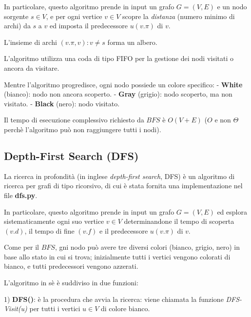 \documentclass[a4paper,12pt]{article}
\begin{document}
In particolare, questo algoritmo prende in input un grafo $G = (V, E)$ e un nodo sorgente $s \in V$, e per ogni vertice $v \in V$ scopre la \textit{distanza} (numero minimo di archi) da $s$ a $v$ ed imposta il predecessore $u (v.\pi)$ di $v$.

L’insieme di archi ${(v.\pi, v) : v\neq s}$ forma un albero.

L'algoritmo utilizza una coda di tipo FIFO per la gestione dei nodi visitati o ancora da visitare.
\newline

Mentre l'algoritmo progredisce, ogni nodo possiede un colore specifico:\newline
- \textbf{White} (bianco): nodo non ancora scoperto.\newline
- \textbf{Gray} (grigio): nodo scoperto, ma non visitato.\newline
- \textbf{Black} (nero): nodo visitato.
\newline

Il tempo di esecuzione complessivo richiesto da $BFS$ è $O(V +E)$ ($O$ e non $\Theta$ perchè l'algoritmo può non raggiungere tutti i nodi).

\subsection{Depth-First Search (DFS)} \label{ssec:dfs}
La ricerca in profondità (in inglese \textit{depth-first search}, DFS) è un algoritmo di ricerca per grafi di tipo ricorsivo, di cui è stata fornita una implementazione nel file \textbf{dfs.py}.
\newline

In particolare, questo algoritmo prende in input un grafo $G = (V, E)$ ed esplora sistematicamente ogni suo vertice $v \in V$ determinandone il tempo di scoperta $(v.d)$, il tempo di fine $(v.f)$ e il predecessore $u (v.\pi)$ di $v$.

Come per il $BFS$, gni nodo può avere tre diversi colori (bianco, grigio, nero) in base allo stato in cui si trova; inizialmente tutti i vertici vengono colorati di bianco, e tutti predecessori vengono azzerati.
\newline

L'algoritmo in sè è suddiviso in due funzioni:
\newline

1) \textbf{DFS()}: è la procedura che avvia la ricerca: viene chiamata la funzione \textit{DFS-Visit(u)} per tutti i vertici $u \in V$ di colore bianco.
\end{document}
